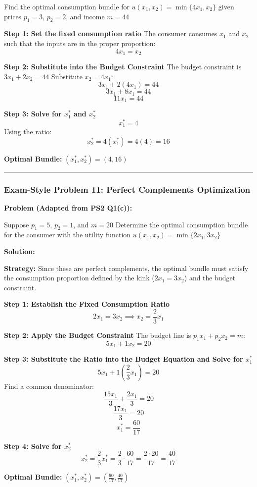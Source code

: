 \documentclass{article}
\begin{document}
Find the optimal consumption bundle for $u(x_1, x_2) = \min\{4x_1, x_2\}$ given prices $p_1=3$, $p_2=2$, and income $m=44$

\textbf{Step 1: Set the fixed consumption ratio}
The consumer consumes $x_1$ and $x_2$ such that the inputs are in the proper proportion:
\[ 4x_1 = x_2 \]

\textbf{Step 2: Substitute into the Budget Constraint}
The budget constraint is $3x_1 + 2x_2 = 44$ Substitute $x_2 = 4x_1$:
\[ 3x_1 + 2(4x_1) = 44 \]
\[ 3x_1 + 8x_1 = 44 \]
\[ 11x_1 = 44 \]

\textbf{Step 3: Solve for $x_1^*$ and $x_2^*$}
\[ x_1^* = 4 \]
Using the ratio:
\[ x_2^* = 4(x_1^*) = 4(4) = 16 \]

\textbf{Optimal Bundle:} $(x_1^*, x_2^*) = (4, 16)$

\medskip\noindent\rule{\linewidth}{0.4pt}\medskip

\subsubsection*{Exam-Style Problem 11: Perfect Complements Optimization}

\textbf{Problem (Adapted from PS2 Q1(c)):}

Suppose $p_1 = 5$, $p_2 = 1$, and $m = 20$ Determine the optimal consumption bundle for the consumer with the utility function $u(x_1, x_2) = \min\{2x_1, 3x_2\}$

\textbf{Solution:}

\textbf{Strategy:} Since these are perfect complements, the optimal bundle must satisfy the consumption proportion defined by the kink ($2x_1 = 3x_2$) and the budget constraint.

\textbf{Step 1: Establish the Fixed Consumption Ratio}
\[ 2x_1 = 3x_2 \implies x_2 = \frac{2}{3} x_1 \]

\textbf{Step 2: Apply the Budget Constraint}
The budget line is $p_1 x_1 + p_2 x_2 = m$:
\[ 5x_1 + 1x_2 = 20 \]

\textbf{Step 3: Substitute the Ratio into the Budget Equation and Solve for $x_1^*$}
\[ 5x_1 + 1\left(\frac{2}{3} x_1\right) = 20 \]
Find a common denominator:
\[ \frac{15x_1}{3} + \frac{2x_1}{3} = 20 \]
\[ \frac{17x_1}{3} = 20 \]
\[ x_1^* = \frac{60}{17} \]

\textbf{Step 4: Solve for $x_2^*$}
\[ x_2^* = \frac{2}{3} x_1^* = \frac{2}{3} \cdot \frac{60}{17} = \frac{2 \cdot 20}{17} = \frac{40}{17} \]

\textbf{Optimal Bundle:} $(x_1^*, x_2^*) = \left(\frac{60}{17}, \frac{40}{17}\right)$
\end{document}
